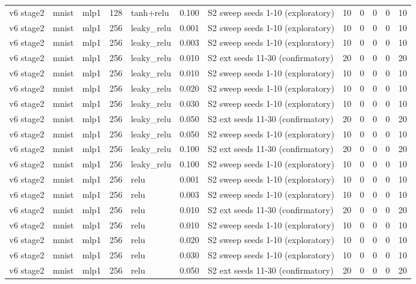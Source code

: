 \begin{table}[htbp]
{\begin{tabular}{@{}lllrlrlrrrrr@{}}
v6 stage2 & mnist & mlp1 & 128 & tanh+relu & 0.100 & S2 sweep seeds 1-10 (exploratory) & 10 & 0 & 0 & 0 & 10 \\
v6 stage2 & mnist & mlp1 & 256 & leaky\_relu & 0.001 & S2 sweep seeds 1-10 (exploratory) & 10 & 0 & 0 & 0 & 10 \\
v6 stage2 & mnist & mlp1 & 256 & leaky\_relu & 0.003 & S2 sweep seeds 1-10 (exploratory) & 10 & 0 & 0 & 0 & 10 \\
v6 stage2 & mnist & mlp1 & 256 & leaky\_relu & 0.010 & S2 ext seeds 11-30 (confirmatory) & 20 & 0 & 0 & 0 & 20 \\
v6 stage2 & mnist & mlp1 & 256 & leaky\_relu & 0.010 & S2 sweep seeds 1-10 (exploratory) & 10 & 0 & 0 & 0 & 10 \\
v6 stage2 & mnist & mlp1 & 256 & leaky\_relu & 0.020 & S2 sweep seeds 1-10 (exploratory) & 10 & 0 & 0 & 0 & 10 \\
v6 stage2 & mnist & mlp1 & 256 & leaky\_relu & 0.030 & S2 sweep seeds 1-10 (exploratory) & 10 & 0 & 0 & 0 & 10 \\
v6 stage2 & mnist & mlp1 & 256 & leaky\_relu & 0.050 & S2 ext seeds 11-30 (confirmatory) & 20 & 0 & 0 & 0 & 20 \\
v6 stage2 & mnist & mlp1 & 256 & leaky\_relu & 0.050 & S2 sweep seeds 1-10 (exploratory) & 10 & 0 & 0 & 0 & 10 \\
v6 stage2 & mnist & mlp1 & 256 & leaky\_relu & 0.100 & S2 ext seeds 11-30 (confirmatory) & 20 & 0 & 0 & 0 & 20 \\
v6 stage2 & mnist & mlp1 & 256 & leaky\_relu & 0.100 & S2 sweep seeds 1-10 (exploratory) & 10 & 0 & 0 & 0 & 10 \\
v6 stage2 & mnist & mlp1 & 256 & relu & 0.001 & S2 sweep seeds 1-10 (exploratory) & 10 & 0 & 0 & 0 & 10 \\
v6 stage2 & mnist & mlp1 & 256 & relu & 0.003 & S2 sweep seeds 1-10 (exploratory) & 10 & 0 & 0 & 0 & 10 \\
v6 stage2 & mnist & mlp1 & 256 & relu & 0.010 & S2 ext seeds 11-30 (confirmatory) & 20 & 0 & 0 & 0 & 20 \\
v6 stage2 & mnist & mlp1 & 256 & relu & 0.010 & S2 sweep seeds 1-10 (exploratory) & 10 & 0 & 0 & 0 & 10 \\
v6 stage2 & mnist & mlp1 & 256 & relu & 0.020 & S2 sweep seeds 1-10 (exploratory) & 10 & 0 & 0 & 0 & 10 \\
v6 stage2 & mnist & mlp1 & 256 & relu & 0.030 & S2 sweep seeds 1-10 (exploratory) & 10 & 0 & 0 & 0 & 10 \\
v6 stage2 & mnist & mlp1 & 256 & relu & 0.050 & S2 ext seeds 11-30 (confirmatory) & 20 & 0 & 0 & 0 & 20 \\

\end{tabular}}
\end{table}

